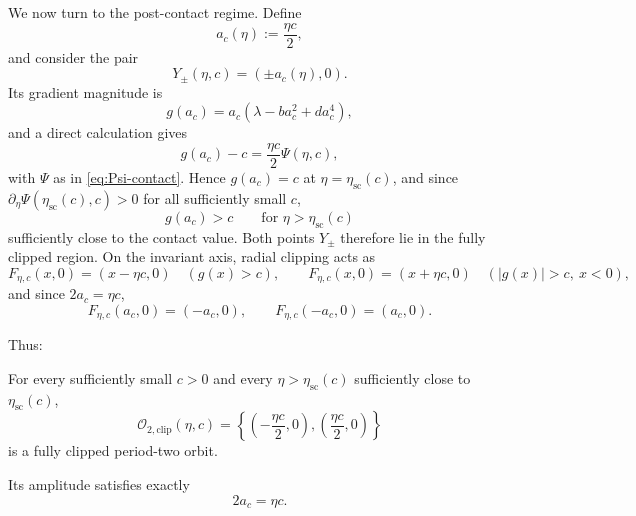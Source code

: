 We now turn to the post-contact regime.  Define
\begin{equation}
a_c(\eta)
:=
\frac{\eta c}{2},
\label{eq:ac-definition}
\end{equation}
and consider the pair
\begin{equation}
Y_\pm(\eta,c)
=
(\pm a_c(\eta),0).
\label{eq:symmetric-clipped-pair}
\end{equation}
Its gradient magnitude is
\begin{equation}
g(a_c)
=
a_c
\left(
\lambda
-
ba_c^2
+
da_c^4
\right),
\label{eq:g-ac}
\end{equation}
and a direct calculation gives
\begin{equation}
g(a_c)-c
=
\frac{\eta c}{2}
\Psi(\eta,c),
\label{eq:g-minus-c-Psi}
\end{equation}
with $\Psi$ as in \eqref{eq:Psi-contact}.  Hence $g(a_c)=c$ at
$\eta=\eta_{\mathrm{sc}}(c)$, and since
$\partial_\eta\Psi(\eta_{\mathrm{sc}}(c),c)>0$ for all sufficiently
small $c$,
\begin{equation}
g(a_c)>c
\qquad
\text{for }
\eta>\eta_{\mathrm{sc}}(c)
\label{eq:ac-fully-clipped}
\end{equation}
sufficiently close to the contact value.  Both points $Y_\pm$
therefore lie in the fully clipped region.  On the invariant axis,
radial clipping acts as
\[
F_{\eta,c}(x,0)
=
(x-\eta c,0)\quad(g(x)>c),
\qquad
F_{\eta,c}(x,0)
=
(x+\eta c,0)\quad(|g(x)|>c,\ x<0),
\]
and since $2a_c=\eta c$,
\begin{equation}
F_{\eta,c}(a_c,0)
=
(-a_c,0),
\qquad
F_{\eta,c}(-a_c,0)
=
(a_c,0).
\label{eq:clipped-symmetric-forward}
\end{equation}

Thus:

\begin{proposition}
\label{prop:explicit-clipped-branch}
For every sufficiently small $c>0$ and every
$\eta>\eta_{\mathrm{sc}}(c)$ sufficiently close to
$\eta_{\mathrm{sc}}(c)$,
\begin{equation}
\boxed{
\mathcal O_{2,\mathrm{clip}}(\eta,c)
=
\left\{
\left(-\frac{\eta c}{2},0\right),
\left(\frac{\eta c}{2},0\right)
\right\}
}
\label{eq:explicit-clipped-cycle}
\end{equation}
is a fully clipped period-two orbit.

Its amplitude satisfies exactly
\begin{equation}
\boxed{
2a_c=\eta c.
}
\label{eq:exact-amplitude-saturation-planar}
\end{equation}
\end{proposition}

